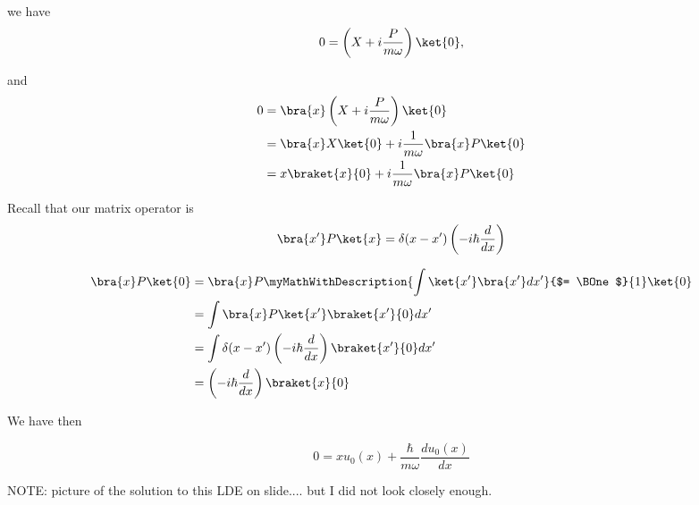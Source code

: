 we have
\begin{equation}\label{eqn:PHY356FLecture11:520}
0
=
\left( X + i \frac{P}{m \omega} \right) \ket{0},
\end{equation}

and
\begin{align*}
0
&=
\bra{x} \left( X + i \frac{P}{m \omega} \right) \ket{0} \\
&=
\bra{x} X \ket{0 } + i \frac{1}{m \omega} \bra{x} P \ket{0} \\
&=
x \braket{x}{0} + i \frac{1}{m \omega} \bra{x} P \ket{0} \\
\end{align*}

Recall that our matrix operator is
\begin{equation}\label{eqn:PHY356FLecture11:540}
\bra{x'} P \ket{x} = \delta(x - x') \left( -i \hbar \frac{d}{dx} \right)
\end{equation}

\begin{align*}
\bra{x} P \ket{0}
&=
\bra{x} P \myMathWithDescription{\int \ket{x'} \bra{x'} dx' }{$= \BOne$}{1}\ket{0} \\
&=
\int \bra{x} P \ket{x'} \braket{x'}{0} dx' \\
&=
\int
\delta(x - x') \left( -i \hbar \frac{d}{dx} \right)
\braket{x'}{0} dx' \\
&=
\left( -i \hbar \frac{d}{dx} \right)
\braket{x}{0}
\end{align*}

We have then

\begin{equation}\label{eqn:PHY356FLecture11:600}
0 =
x u_0(x) + \frac{\hbar}{m \omega} \frac{d u_0(x)}{dx}
\end{equation}

NOTE: picture of the solution to this LDE on slide.... but I did not look closely enough.

